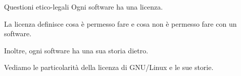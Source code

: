 \begin{slide}{Questioni etico-legali}
Ogni software ha una licenza.

La licenza definisce cosa è permesso fare e cosa non è permesso fare con
un software.

Inoltre, ogni software ha una sua storia dietro.

Vediamo le particolarità della licenza di GNU/Linux e le sue storie.

\end{slide}

